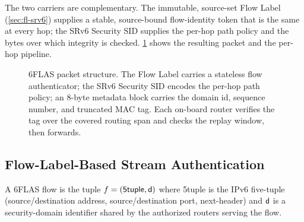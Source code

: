 The two carriers are complementary. The immutable, source-set Flow Label
(\cref{sec:fl-srv6}) supplies a stable, source-bound flow-identity token that is
the same at every hop; the SRv6 Security SID supplies the per-hop path policy
and the bytes over which integrity is checked. \cref{fig:overview} shows the
resulting packet and the per-hop pipeline.

\begin{figure}[t]
\centering
\footnotesize
\setlength{\fboxsep}{4pt}
\caption{6FLAS packet structure. The Flow Label carries a stateless flow
authenticator; the SRv6 Security SID encodes the per-hop path policy; an
8-byte metadata block carries the domain id, sequence number, and truncated MAC
tag. Each on-board router verifies the tag over the covered routing span and
checks the replay window, then forwards.}
\label{fig:overview}
\end{figure}

\subsection{Flow-Label-Based Stream Authentication}
\label{sec:fl-auth}

\begin{definition}
\label{def:flow}
A 6FLAS flow is the tuple $f=(\textsf{5tuple},\mathsf{d})$ where \textsf{5tuple} is
the IPv6 five-tuple (source/destination address, source/destination port,
next-header) and $\mathsf{d}$ is a security-domain identifier shared by the
authorized routers serving the flow.
\end{definition}

